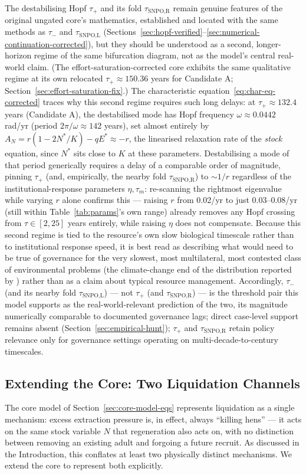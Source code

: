 \documentclass[twocolumn,10pt]{article}
\begin{document}
The destabilising Hopf $\tau_+$ and its fold $\tau_{\text{SNPO,R}}$ remain genuine features of the original ungated core's mathematics, established and located with the same methods as $\tau_-$ and $\tau_{\text{SNPO,L}}$ (Sections~\ref{sec:hopf-verified}--\ref{sec:numerical-continuation-corrected}), but they should be understood as a second, longer-horizon regime of the same bifurcation diagram, not as the model's central real-world claim. (The effort-saturation-corrected core exhibits the same qualitative regime at its own relocated $\tau_+\approx150.36$ years for Candidate A; Section~\ref{sec:effort-saturation-fix}.) The characteristic equation~\eqref{eq:char-eq-corrected} traces why this second regime requires such long delays: at $\tau_+\approx132.4$ years (Candidate A), the destabilised mode has Hopf frequency $\omega\approx0.0442$ rad/yr (period $2\pi/\omega\approx142$ years), set almost entirely by $A_N=r(1-2N^*/K)-qE^*\approx-r$, the linearised relaxation rate of the \emph{stock} equation, since $N^*$ sits close to $K$ at these parameters. Destabilising a mode of that period generically requires a delay of a comparable order of magnitude, pinning $\tau_+$ (and, empirically, the nearby fold $\tau_{\text{SNPO,R}}$) to $\sim1/r$ regardless of the institutional-response parameters $\eta,\tau_m$: re-scanning the rightmost eigenvalue while varying $r$ alone confirms this — raising $r$ from 0.02/yr to just 0.03--0.08/yr (still within Table~\ref{tab:params}'s own range) already removes any Hopf crossing from $\tau\in[2,25]$ years entirely, while raising $\eta$ does not compensate. Because this second regime is tied to the resource's own slow biological timescale rather than to institutional response speed, it is best read as describing what would need to be true of governance for the very slowest, most multilateral, most contested class of environmental problems (the climate-change end of the distribution reported by \cite{hocherman2025}) rather than as a claim about typical resource management. Accordingly, $\tau_-$ (and its nearby fold $\tau_{\text{SNPO,L}}$) — not $\tau_+$ (and $\tau_{\text{SNPO,R}}$) — is the threshold pair this model supports as the real-world-relevant prediction of the two, its magnitude numerically comparable to documented governance lags; direct case-level support remains absent (Section~\ref{sec:empirical-hunt}); $\tau_+$ and $\tau_{\text{SNPO,R}}$ retain policy relevance only for governance settings operating on multi-decade-to-century timescales.

\subsection{Extending the Core: Two Liquidation Channels}
\label{sec:two-channel}
The core model of Section~\ref{sec:core-model-eqs} represents liquidation as a single mechanism: excess extraction pressure is, in effect, always ``killing hens'' — it acts on the same stock variable $N$ that regeneration also acts on, with no distinction between removing an existing adult and forgoing a future recruit. As discussed in the Introduction, this conflates at least two physically distinct mechanisms. We extend the core to represent both explicitly.
\end{document}
